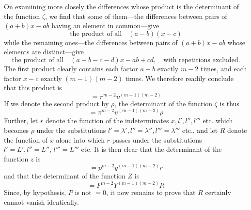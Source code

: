 On examining more closely the differences whose product is the determinant of the function $\zeta$, we find that some of them---the differences between pairs of $(a+b)x-ab$ having an element in common---give
\[
\text{the product of all}\quad(a-b)(x-c)
\]
while the remaining ones---the differences between pairs of $(a+b)x-ab$ whose elements are distinct---give
\[
\text{the product of all}\quad(a+b-c-d)x-ab+cd,\quad\text{with repetitions excluded.}
\]
The first product clearly contains each factor $a-b$ exactly $m-2$ times, and each factor $x-c$ exactly $(m-1)(m-2)$ times. We therefore readily conclude that this product is
\[
=\pi^{m-2}\upsilon^{(m-1)(m-2)}
\]
If we denote the second product by $\rho$, the determinant of the function $\zeta$ is thus
\[
=\pi^{m-2}\upsilon^{(m-1)(m-2)}\rho
\]
Further, let $r$ denote the function of the indeterminates $x,l',l'',l'''$ etc. which becomes $\rho$ under the substitutions $l'=\lambda',l''=\lambda'',l'''=\lambda'''$ etc., and let $R$ denote
the function of $x$ alone into which $r$ passes under the substitutions $l'=L',l''=L''$, $l'''=L'''$ etc. It is then clear that the determinant of the function $z$ is
\[
=p^{m-2}y^{(m-1)(m-2)}r
\]
and that the determinant of the function $Z$ is
\[
=P^{m-2}Y^{(m-1)(m-2)}R
\]
Since, by hypothesis, $P$ is not $=0$, it now remains to prove that $R$ certainly cannot vanish identically.

